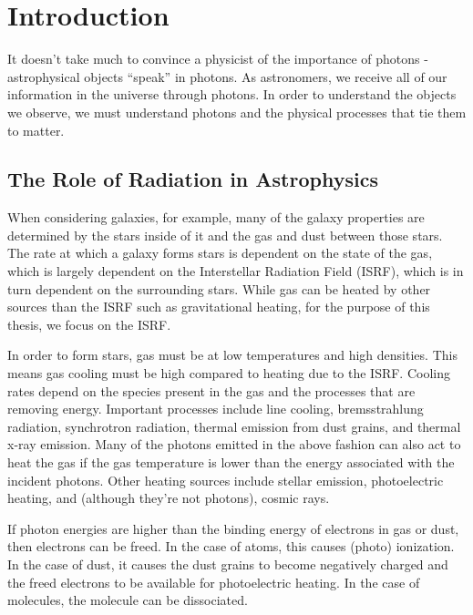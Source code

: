 \pagestyle{fancy}
\headheight 20pt
\chead{}
\lfoot{}
\cfoot{\thepage}
\rfoot{}
\renewcommand{\headrulewidth}{0.1pt}
\renewcommand{\footrulewidth}{0.1pt}

\chapter{Introduction}
\label{chap:intro} 
\thispagestyle{fancy} 

It doesn't take much to convince a physicist of the importance of photons - astrophysical objects ``speak'' in photons. As astronomers, we receive all of our information in the universe through photons. In order to understand the objects we observe, we must understand photons and the physical processes that tie them to matter. 

\section{The Role of Radiation in Astrophysics}
\label{sec:radinastro}

When considering galaxies, for example, many of the galaxy properties are determined by the stars inside of it and the gas and dust between those stars. The rate at which a galaxy forms stars is dependent on the state of the gas, which is largely dependent on the Interstellar Radiation Field (ISRF), which is in turn dependent on the surrounding stars. While gas can be heated by other sources than the ISRF such as gravitational heating, for the purpose of this thesis, we focus on the ISRF.

In order to form stars, gas must be at low temperatures and high densities. This means gas cooling must be high compared to heating due to the ISRF. Cooling rates depend on the species present in the gas and the processes that are removing energy. Important processes include line cooling, bremsstrahlung radiation, synchrotron radiation, thermal emission from dust grains, and thermal x-ray emission. Many of the photons emitted in the above fashion can also act to heat the gas if the gas temperature is lower than the energy associated with the incident photons. Other heating sources include stellar emission, photoelectric heating, and (although they're not photons), cosmic rays.

If photon energies are higher than the binding energy of electrons in gas or dust, then electrons can be freed. In the case of atoms, this causes (photo) ionization. In the case of dust, it causes the dust grains to become negatively charged and the freed electrons to be available for photoelectric heating. In the case of molecules, the molecule can be dissociated.


